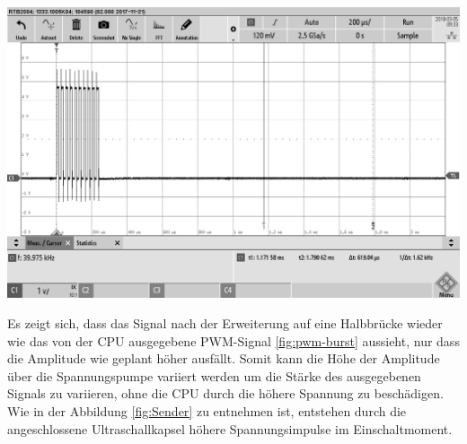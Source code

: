 \begin{minipage}{0.5\textwidth}
\includegraphics[width=1\textwidth%
]{Abbildungen/MessungenP1/PWM-Nach-der-Halbbrucke-mit-LS.png}
\label{fig:Sender}
\end{minipage}
Es zeigt sich, dass das Signal nach der Erweiterung auf eine Halbbrücke wieder wie das von der CPU ausgegebene PWM-Signal \ref{fig:pwm-burst} aussieht, nur dass die Amplitude wie geplant höher ausfällt. Somit kann die Höhe der Amplitude über die Spannungspumpe variiert werden um die Stärke des ausgegebenen Signals zu variieren, ohne die CPU durch die höhere Spannung zu beschädigen.
Wie in der Abbildung \ref{fig:Sender} zu entnehmen ist, entstehen durch die angeschlossene Ultraschallkapsel höhere Spannungsimpulse im Einschaltmoment.

